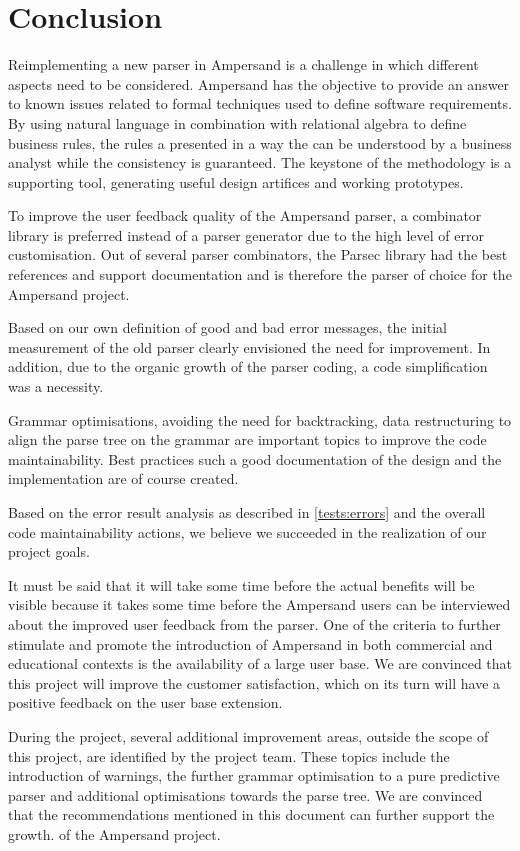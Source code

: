 
\section{Conclusion}
\label{sec:conclusion}
Reimplementing a new parser in Ampersand is a challenge in which different aspects need to be considered.
Ampersand has the objective to provide an answer to known issues related to formal techniques used to define software requirements.
By using natural language in combination with relational algebra to define business rules, the rules a presented in a way the can be understood by a business analyst while the consistency is guaranteed.
The keystone of the methodology is a supporting tool, generating useful design artifices and working prototypes.

To improve the user feedback quality of the Ampersand parser, a combinator library is preferred instead of a parser generator due to the high level of error customisation. 
Out of several parser combinators, the Parsec library had the best references and support documentation and is therefore the parser of choice for the Ampersand project.

Based on our own definition of good and bad error messages, the initial measurement of the old parser clearly envisioned the need for improvement.
In addition, due to the organic growth of the parser coding, a code simplification was a necessity.

Grammar optimisations, avoiding the need for backtracking, data restructuring to align the parse tree on the grammar are important topics to improve the code maintainability.
Best practices such a good documentation of the design and the implementation are of course created.

Based on the error result analysis as described in \autoref{tests:errors} and the overall code maintainability actions, we believe we succeeded in the realization of our project goals.

It must be said that it will take some time before the actual benefits will be visible because it takes some time before the Ampersand users can be interviewed about the improved user feedback from the parser.
One of the criteria to further stimulate and promote the introduction of Ampersand in both commercial and educational contexts is the availability of a large user base.
We are convinced that this project will improve the customer satisfaction, which on its turn will have a positive feedback on the user base extension.

During the project, several additional improvement areas, outside the scope of this project, are identified by the project team.
These topics include the introduction of warnings, the further grammar optimisation to a pure predictive parser and additional optimisations towards the parse tree.
We are convinced that the recommendations mentioned in this document can further support the growth. of the Ampersand project.